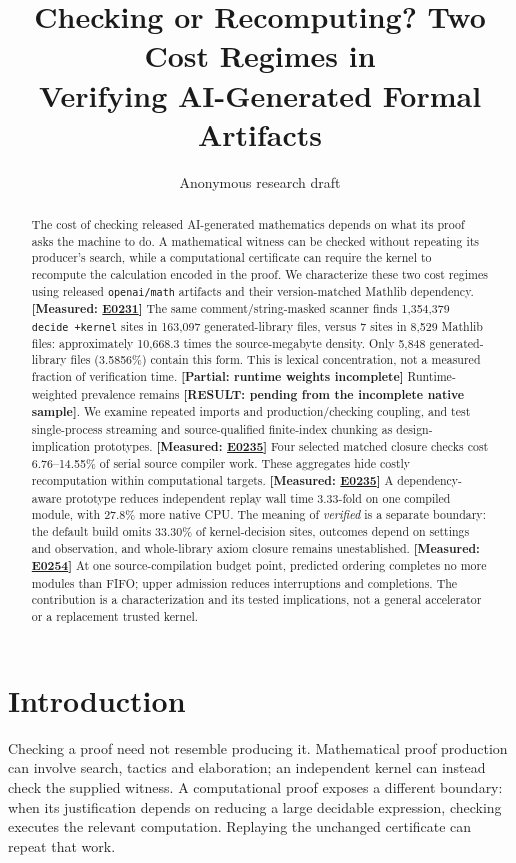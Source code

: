\documentclass[10pt,twocolumn]{article}
\title{Checking or Recomputing? Two Cost Regimes in\\Verifying AI-Generated Formal Artifacts}
\author{Anonymous research draft}
\date{}
\newcommand{\missing}[1]{\textbf{[RESULT: #1]}}
\newcommand{\measured}[1]{\textbf{[Measured: #1]}}
\newcommand{\partialev}[1]{\textbf{[Partial: #1]}}
\newcommand{\expref}[2]{\href{https://github.com/yunwei37/proofserve/blob/main/docs/tmp/build-and-evaluate/step-#1/step-report.md}{E#2}}
\begin{document}
\maketitle
\begin{abstract}
The cost of checking released AI-generated mathematics depends on what
its proof asks the machine to do. A mathematical witness can be checked without repeating its
producer's search, while a computational certificate can require the
kernel to recompute the calculation encoded in the proof.
We characterize these two cost regimes using released \texttt{openai/math}
artifacts and their version-matched Mathlib dependency.
\measured{\expref{0231-20261101T001556+0000}{0231}}
The same comment/string-masked scanner finds 1,354,379
\texttt{decide +kernel} sites in 163,097 generated-library files,
versus 7 sites in 8,529 Mathlib files: approximately
10,668.3 times the source-megabyte density.
Only 5,848 generated-library files (3.5856\%) contain this form.
This is lexical concentration, not a measured fraction of verification time.
\partialev{runtime weights incomplete} Runtime-weighted prevalence remains
\missing{pending from the incomplete native sample}.
We examine repeated imports and production/checking coupling, and test
single-process streaming and source-qualified finite-index chunking
as design-implication prototypes.
\measured{\expref{0235-20261101T041713+0000}{0235}}
Four selected matched closure checks cost 6.76--14.55\% of serial
source compiler work. These aggregates hide costly recomputation within
computational targets.
\measured{\expref{0235-20261101T041713+0000}{0235}}
A dependency-aware prototype reduces independent replay wall time
3.33-fold on one compiled module, with 27.8\% more native CPU.
The meaning of \emph{verified} is a separate boundary: the default build
omits 33.30\% of kernel-decision sites, outcomes depend on settings and
observation, and whole-library axiom closure remains unestablished.
\measured{\expref{0254-20261101T195608+0000}{0254}}
At one source-compilation budget point, predicted ordering completes no more
modules than FIFO; upper admission reduces interruptions and completions.
The contribution is a characterization and its tested implications, not a
general accelerator or a replacement trusted kernel.
\end{abstract}

\section{Introduction}
Checking a proof need not resemble producing it.
Mathematical proof production can involve search, tactics and elaboration;
an independent kernel can instead check the supplied witness.
A computational proof exposes a different boundary: when its
justification depends on reducing a large decidable expression,
checking executes the relevant computation.
Replaying the unchanged certificate can repeat that work.
\end{document}

